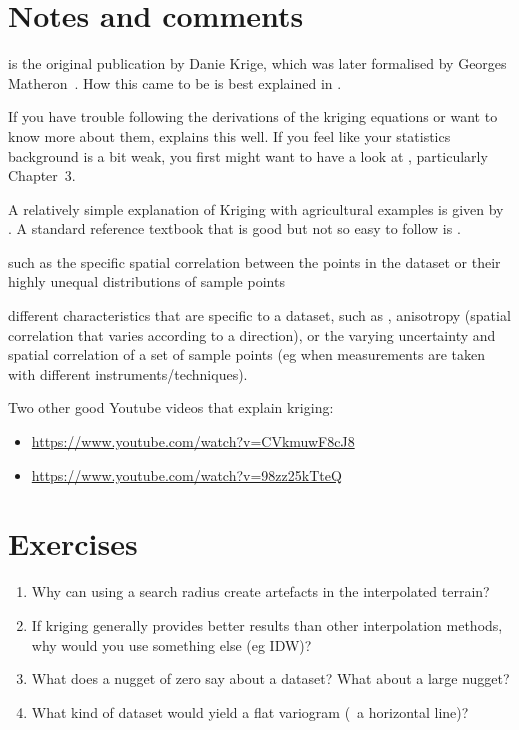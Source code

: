 %
\section{Notes and comments}

\citet{Krige51} is the original publication by Danie Krige, which was later formalised by Georges Matheron~\citep{Matheron62,Matheron65}.
How this came to be is best explained in \citet{cressie93}.

If you have trouble following the derivations of the kriging equations or want to know more about them, \citet{Lichtenstern13} explains this well.
If you feel like your statistics background is a bit weak, you first might want to have a look at \citet{Fewster14}, particularly Chapter~3.

A relatively simple explanation of Kriging with agricultural examples is given by \citet{Oliver15}.
A standard reference textbook that is good but not so easy to follow is \citet{Wackernagel03}.

such as the specific spatial correlation between the points in the dataset or their highly unequal distributions of sample points


different characteristics that are specific to a dataset, such as , anisotropy (spatial correlation that varies according to a direction), or the varying uncertainty and spatial correlation of a set of sample points (eg when measurements are taken with different instruments/techniques).

Two other good Youtube videos that explain kriging:
\begin{itemize}
\item \url{https://www.youtube.com/watch?v=CVkmuwF8cJ8}
\item \url{https://www.youtube.com/watch?v=98zz25kTteQ}
\end{itemize}

%
\section{Exercises}

\begin{enumerate}
\item Why can using a search radius create artefacts in the interpolated terrain?
\item If kriging generally provides better results than other interpolation methods, why would you use something else (eg IDW)?
\item What does a nugget of zero say about a dataset? What about a large nugget?
\item What kind of dataset would yield a flat variogram (\ie\ a horizontal line)?
\end{enumerate}